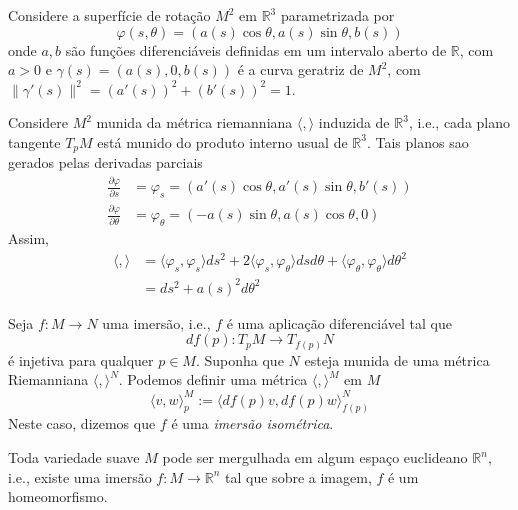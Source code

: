 \begin{exemplo}
	Considere a superfície de rotação $M^2$ em $\mathbb{R}^3$ parametrizada por
	\begin{equation*}
		\varphi(s,\theta) = (a(s) \cos \theta, a(s) \sin \theta, b(s))
	\end{equation*}	
	onde $a,b$ são funções diferenciáveis definidas em um intervalo aberto de $\mathbb{R}$, com $a>0$ e $\gamma(s) = (a(s),0,b(s))$ é a curva geratriz de $M^2$, com $\| \gamma'(s) \|^2 = (a'(s))^2 + (b'(s))^2 = 1$.
	
	Considere $M^2$ munida da métrica riemanniana $\langle , \rangle$ induzida de $\mathbb{R}^3$, i.e., cada plano tangente $T_p M$ está munido do produto interno usual de $\mathbb{R}^3$. Tais planos sao gerados pelas derivadas parciais
	\begin{align*}
		\frac{\partial \varphi}{\partial s} &= \varphi_s = (a'(s) \cos \theta, a'(s) \sin \theta, b'(s))\\
		\frac{\partial \varphi}{\partial \theta} &= \varphi_{\theta} = (-a(s) \sin \theta, a(s) \cos \theta, 0)
	\end{align*}	
	Assim,
	\begin{align*}
		\langle , \rangle &= \langle \varphi_s, \varphi_s \rangle ds^2 + 2 \langle \varphi_s, \varphi_{\theta} \rangle ds d\theta + \langle \varphi_{\theta}, \varphi_{\theta} \rangle d\theta^2\\
		&= ds^2 + a(s)^2 d\theta^2
	\end{align*}
\end{exemplo}

\begin{exemplo}
	Seja $f: M \rightarrow N$ uma imersão, i.e., $f$ é uma aplicação diferenciável tal que
	\begin{equation*}
		df(p): T_p M \rightarrow T_{f(p)} N
	\end{equation*}	
	é injetiva para qualquer $p \in M$. Suponha que $N$ esteja munida de uma métrica Riemanniana $\langle , \rangle^N$. Podemos definir uma métrica $\langle , \rangle^M$ em $M$
	\begin{equation*}
		\langle v,w \rangle_p^M := \langle df(p) v, df(p) w \rangle_{f(p)}^N
	\end{equation*}	
	Neste caso, dizemos que $f$ é uma \emph{imersão isométrica}.
\end{exemplo}

\begin{teorema}[Nash]
	Toda variedade suave $M$ pode ser mergulhada em algum espaço euclideano $\mathbb{R}^n$, i.e., existe uma imersão $f: M \rightarrow \mathbb{R}^n$ tal que sobre a imagem, $f$ é um homeomorfismo.
\end{teorema}

